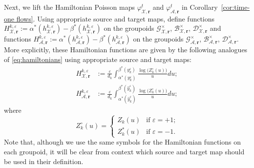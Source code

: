 \documentclass{amsart}
\numberwithin{equation}{section}
\newcommand{\bfr}{{\boldsymbol{r}}}
\newcommand{\cA}{\mathcal{A}}
\newcommand{\cB}{\mathcal{B}}
\newcommand{\cD}{\mathcal{D}}
\newcommand{\cG}{\mathcal{G}}
\newcommand{\cX}{\mathcal{X}}
\begin{document}
Next, we lift the Hamiltonian Poisson maps $\varphi_{\cX,\bfr}^t$ and $\varphi_{\cA,\bfr}^t$ in Corollary~\ref{cor:time-one flows}.
Using appropriate source and target maps, define functions $H_{\cX,\bfr}^{k,\varepsilon}:=\alpha^*(h_{\cX,\bfr}^{k,\varepsilon})-\beta^*(h_{\cX,\bfr}^{k,\varepsilon})$ on the groupoids $\cG^\times_{\cX,\bfr}$, $\cB^\times_{\cX,\bfr}$, $\cD^\times_{\cX,\bfr}$ and functions $H_{\cA,\bfr}^{k,\varepsilon}:=\alpha^*(h_{\cA,\bfr}^{k,\varepsilon})-\beta^*(h_{\cA,\bfr}^{k,\varepsilon})$ on the groupoids $\cG^\times_{\cA,\bfr}$, $\cB^\times_{\cA,\bfr}$, $\cD^\times_{\cA,\bfr}$.
More explicitly, these Hamiltonian functions are given by the following analogues of \eqref{eq:hamiltonians} using appropriate source and target maps:
\begin{align}
  \label{eq:X hamiltonian}
  H_{\cX,\bfr}^{k,\varepsilon}&:=\frac{\varepsilon}{d_k}\int_{\alpha^*(y_k^\varepsilon)}^{\beta^*(y_k^\varepsilon)} \frac{\log\big(Z_k^\circ(u)\big)}{u}du;\\
  \label{eq:A hamiltonian}
  H_{\cA,\bfr}^{k,\varepsilon}&:=\frac{\varepsilon}{d_k}\int_{\alpha^*(\hat y_k^\varepsilon)}^{\beta^*(\hat y_k^\varepsilon)} \frac{\log\big(Z_k^\circ(u)\big)}{u}du;
\end{align}
where
\[ Z_k^\circ(u)=\begin{cases} Z_k(u) & \text{if $\varepsilon=+1$;}\\ Z_k^*(u) & \text{if $\varepsilon=-1$.} \end{cases}\]
Note that, although we use the same symbols for the Hamiltonian functions on each groupoid, it will be clear from context which source and target map should be used in their definition.
\end{document}
